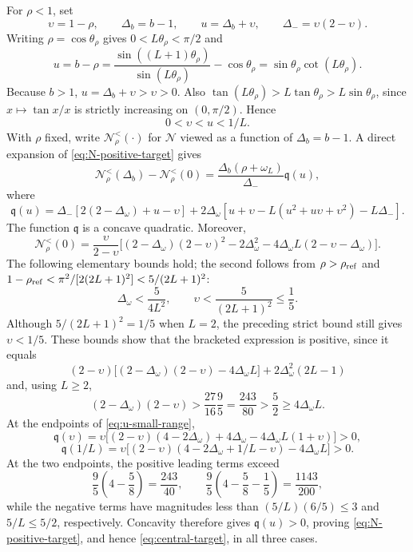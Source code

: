 \documentclass[12pt,anonymous]{iopjournal}
\numberwithin{equation}{section}
\theoremstyle{remark}
\begin{document}
For \(\rho<1\), set
\[
 \upsilon=1-\rho,\qquad \Delta_b=b-1,\qquad
 u=\Delta_b+\upsilon,\qquad \Delta_-=\upsilon(2-\upsilon).
\]
Writing \(\rho=\cos\theta_\rho\) gives
\(0<L\theta_\rho<\pi/2\) and
\[
 u=b-\rho
 =\frac{\sin((L+1)\theta_\rho)}{\sin(L\theta_\rho)}
  -\cos\theta_\rho
 =\sin\theta_\rho\cot(L\theta_\rho).
\]
Because \(b>1\), \(u=\Delta_b+\upsilon>\upsilon>0\).  Also
\(\tan(L\theta_\rho)>L\tan\theta_\rho>L\sin\theta_\rho\), since
\(x\mapsto\tan x/x\) is strictly increasing on \((0,\pi/2)\).
Hence
\begin{equation}\label{eq:u-small-range}
 0<\upsilon<u<1/L.
\end{equation}
With \(\rho\) fixed, write \(\mathcal N_\rho^{<}(\mathord\cdot)\) for
\(\mathcal N\) viewed as a function of \(\Delta_b=b-1\).
A direct expansion of \eqref{eq:N-positive-target} gives
\[
 \mathcal N_\rho^{<}(\Delta_b)-\mathcal N_\rho^{<}(0)
 =\frac{\Delta_b(\rho+\omega_L)}{\Delta_-}\mathfrak q(u),
\]
where
\[
 \mathfrak q(u)=\Delta_-[2(2-\Delta_\omega)+u-\upsilon]
 +2\Delta_\omega
 [u+\upsilon-L(u^2+u\upsilon+\upsilon^2)-L\Delta_-].
\]
The function \(\mathfrak q\) is a concave quadratic.  Moreover,
\[
 \mathcal N_\rho^{<}(0)=\frac{\upsilon}{2-\upsilon}
 \bigl[(2-\Delta_\omega)(2-\upsilon)^2
 -2\Delta_\omega^2
 -4\Delta_\omega L(2-\upsilon-\Delta_\omega)\bigr].
\]
The following elementary bounds hold; the second follows from
\(\rho>\rho_{\rm ref}\) and
\(1-\rho_{\rm ref}<\pi^2/[2(2L+1)^2]<5/(2L+1)^2\):
\begin{equation}\label{eq:Delta-upsilon-bounds}
 \Delta_\omega<\frac5{4L^2},\qquad
 \upsilon<\frac5{(2L+1)^2}\leq\frac15.
\end{equation}
Although \(5/(2L+1)^2=1/5\) when \(L=2\), the preceding strict bound still
gives \(\upsilon<1/5\).  These bounds
show that the bracketed expression is positive, since it equals
\[
 (2-\upsilon)
 \bigl[(2-\Delta_\omega)(2-\upsilon)-4\Delta_\omega L\bigr]
 +2\Delta_\omega^2(2L-1)
\]
and, using \(L\geq2\),
\[
 (2-\Delta_\omega)(2-\upsilon)
 >\frac{27}{16}\frac95=\frac{243}{80}
 >\frac52\geq4\Delta_\omega L.
\]
At the endpoints of
\eqref{eq:u-small-range},
\[
 \mathfrak q(\upsilon)=\upsilon
 \bigl[(2-\upsilon)(4-2\Delta_\omega)
 +4\Delta_\omega-4\Delta_\omega L(1+\upsilon)\bigr]>0,
\]
\[
 \mathfrak q(1/L)=\upsilon
 \bigl[(2-\upsilon)(4-2\Delta_\omega+1/L-\upsilon)
 -4\Delta_\omega L\bigr]>0.
\]
At the two endpoints, the positive leading terms exceed
\[
 \frac95\left(4-\frac58\right)=\frac{243}{40},
 \qquad
 \frac95\left(4-\frac58-\frac15\right)=\frac{1143}{200},
\]
while the negative terms have magnitudes less than
\((5/L)(6/5)\leq3\) and \(5/L\leq5/2\), respectively.  Concavity therefore
gives \(\mathfrak q(u)>0\), proving \eqref{eq:N-positive-target}, and hence
\eqref{eq:central-target}, in all three cases.
\end{document}
